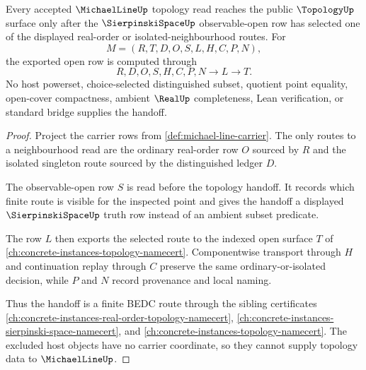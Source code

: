\begin{theorem}
\label{thm:michael-line-sierpinski-topology-handoff}
Every accepted $\MichaelLineUp$ topology read reaches the public $\TopologyUp$ surface only after the $\SierpinskiSpaceUp$ observable-open row has selected one of the displayed real-order or isolated-neighbourhood routes. For
$$
M=(R,T,D,O,S,L,H,C,P,N),
$$
the exported open row is computed through
$$
R,D,O,S,H,C,P,N \longrightarrow L \longrightarrow T .
$$
No host powerset, choice-selected distinguished subset, quotient point equality, open-cover compactness, ambient $\RealUp$ completeness, Lean verification, or standard bridge supplies the handoff.
\end{theorem}
\begin{proof}
Project the carrier rows from \autoref{def:michael-line-carrier}. The only routes to a neighbourhood read are the ordinary real-order row $O$ sourced by $R$ and the isolated singleton route sourced by the distinguished ledger $D$.

The observable-open row $S$ is read before the topology handoff. It records which finite route is visible for the inspected point and gives the handoff a displayed $\SierpinskiSpaceUp$ truth row instead of an ambient subset predicate.

The row $L$ then exports the selected route to the indexed open surface $T$ of \autoref{ch:concrete-instances-topology-namecert}. Componentwise transport through $H$ and continuation replay through $C$ preserve the same ordinary-or-isolated decision, while $P$ and $N$ record provenance and local naming.

Thus the handoff is a finite BEDC route through the sibling certificates \autoref{ch:concrete-instances-real-order-topology-namecert}, \autoref{ch:concrete-instances-sierpinski-space-namecert}, and \autoref{ch:concrete-instances-topology-namecert}. The excluded host objects have no carrier coordinate, so they cannot supply topology data to $\MichaelLineUp$.
\end{proof}

